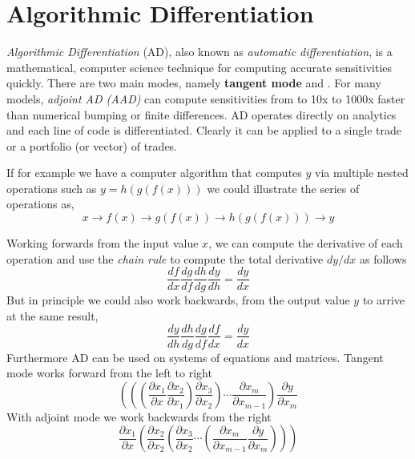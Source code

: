 \documentclass[12pt,a4paper]{article}
\begin{document}
\clearpage
\section{Algorithmic Differentiation}

\emph{Algorithmic Differentiation} (AD), also known as \emph{automatic differentiation}, is a mathematical, computer science technique for computing accurate sensitivities quickly. There are two main modes, namely \textbf{tangent mode} and . For many models, \emph{adjoint AD (AAD)} can compute sensitivities from to 10x to 1000x faster than numerical bumping or finite differences. AD operates directly on analytics and each line of code is differentiated. Clearly it can be applied to a single trade or a portfolio (or vector) of trades.

If for example we have a computer algorithm that computes $y$ via multiple nested operations such as $y = h(g(f(x)))$ we could illustrate the series of operations as,
\begin{equation}
x\rightarrow f(x) \rightarrow g(f(x)) \rightarrow h(g(f(x))) \rightarrow y
\end{equation}

Working forwards from the input value $x$, we can compute the derivative of each operation and use the \emph{chain rule} to compute the total derivative $dy/dx$ as follows
\begin{equation}
\frac{df}{dx}\frac{dg}{df}\frac{dh}{dg}\frac{dy}{dh}=\frac{dy}{dx}
\end{equation}
But in principle we could also work backwards, from the output value $y$ to arrive at the same result,
\begin{equation}
\frac{dy}{dh}\frac{dh}{dg}\frac{dg}{df}\frac{df}{dx}=\frac{dy}{dx}
\end{equation}
Furthermore AD can be used on systems of equations and matrices. 
Tangent mode works forward from the left to right
\begin{equation}
\left(\left(\left(\frac{\partial x_1}{\partial x}\frac{\partial x_2}{\partial x_1}\right)\frac{\partial x_3}{\partial x_2}\right)\cdots\frac{\partial x_m}{\partial x_{m-1}}\right)\frac{\partial y}{\partial x_m}
\end{equation}
With adjoint mode we work backwards from the right
\begin{equation}
\frac{\partial x_1}{\partial x}\left(\frac{\partial x_2}{\partial x_2}\left(\frac{\partial x_3}{\partial x_2}\cdots\left(\frac{\partial x_m}{\partial x_{m-1}}\frac{\partial y}{\partial x_m}\right)\right)\right)
\end{equation}
\end{document}
